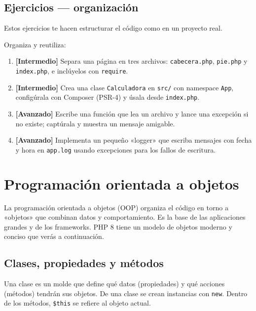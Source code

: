 \documentclass[11pt]{article}
\begin{document}
\subsection{Ejercicios — organización}
Estos ejercicios te hacen estructurar el código como en un proyecto real.

Organiza y reutiliza:

\begin{enumerate}[leftmargin=1.7em,itemsep=3pt,topsep=2pt]
\item \textbf{[Intermedio]} Separa una página en tres archivos: \texttt{cabecera.\allowbreak{}php}, \texttt{pie.\allowbreak{}php} y \texttt{index.\allowbreak{}php}, e inclúyelos con \texttt{require}.
\item \textbf{[Intermedio]} Crea una clase \texttt{Calculadora} en \texttt{src/\allowbreak{}} con namespace \texttt{App}, configúrala con Composer (PSR-4) y úsala desde \texttt{index.\allowbreak{}php}.
\item \textbf{[Avanzado]} Escribe una función que lea un archivo y lance una excepción si no existe; captúrala y muestra un mensaje amigable.
\item \textbf{[Avanzado]} Implementa un pequeño «logger» que escriba mensajes con fecha y hora en \texttt{app.\allowbreak{}log} usando excepciones para los fallos de escritura.
\end{enumerate}
\section{Programación orientada a objetos}
La programación orientada a objetos (OOP) organiza el código en torno a «objetos» que combinan datos y comportamiento. Es la base de las aplicaciones grandes y de los frameworks. PHP 8 tiene un modelo de objetos moderno y conciso que verás a continuación.

\subsection{Clases, propiedades y métodos}
Una clase es un molde que define qué datos (propiedades) y qué acciones (métodos) tendrán sus objetos. De una clase se crean instancias con \texttt{new}. Dentro de los métodos, \texttt{\$this} se refiere al objeto actual.
\end{document}
